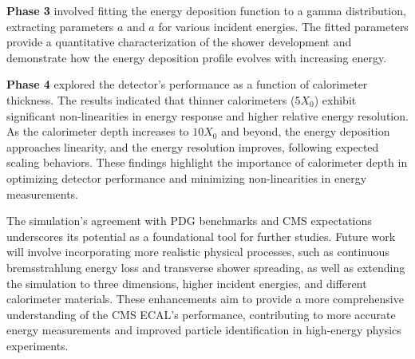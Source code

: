 \documentclass[twocolumn]{aastex631}
\begin{document}
\textbf{Phase 3} involved fitting the energy deposition function to a gamma
distribution, extracting parameters $a$ and $a$ for various incident energies. The
fitted parameters provide a quantitative characterization of the shower
development and demonstrate how the energy deposition profile evolves with
increasing energy.

\textbf{Phase 4} explored the detector’s performance as a function of
calorimeter thickness. The results indicated that thinner calorimeters (5$X_0$)
exhibit significant non-linearities in energy response and higher relative
energy resolution. As the calorimeter depth increases to $10X_0$ and beyond, the
energy deposition approaches linearity, and the energy resolution improves,
following expected scaling behaviors. These findings highlight the importance
of calorimeter depth in optimizing detector performance and minimizing
non-linearities in energy measurements.

The simulation’s agreement with PDG benchmarks and CMS expectations underscores
its potential as a foundational tool for further studies. Future work will
involve incorporating more realistic physical processes, such as continuous
bremsstrahlung energy loss and transverse shower spreading, as well as extending
the simulation to three dimensions, higher incident energies, and different calorimeter materials.
These enhancements aim to provide a more comprehensive understanding of the
CMS ECAL’s performance, contributing to more accurate energy measurements and
improved particle identification in high-energy physics experiments.




\newpage

\nocite{*}
\end{document}
